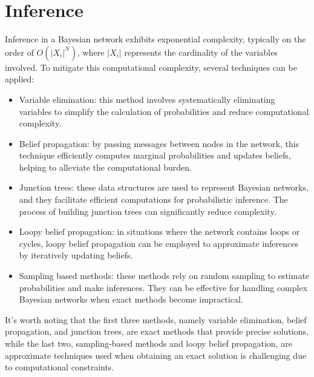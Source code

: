 \section{Inference}

Inference in a Bayesian network exhibits exponential complexity, typically on the order of $O(\left\lvert X_i \right\rvert^N)$, where $\left\lvert X_i \right\rvert$ represents the cardinality of the variables involved. 
To mitigate this computational complexity, several techniques can be applied:

\begin{itemize}
    \item Variable elimination: this method involves systematically eliminating variables to simplify the calculation of probabilities and reduce computational complexity.
    \item Belief propagation: by passing messages between nodes in the network, this technique efficiently computes marginal probabilities and updates beliefs, helping to alleviate the computational burden.
    \item Junction trees: these data structures are used to represent Bayesian networks, and they facilitate efficient computations for probabilistic inference. 
        The process of building junction trees can significantly reduce complexity.
    \item Loopy belief propagation: in situations where the network contains loops or cycles, loopy belief propagation can be employed to approximate inferences by iteratively updating beliefs.
    \item Sampling based methods: these methods rely on random sampling to estimate probabilities and make inferences. 
        They can be effective for handling complex Bayesian networks when exact methods become impractical.
\end{itemize}
It's worth noting that the first three methods, namely variable elimination, belief propagation, and junction trees, are exact methods that provide precise solutions, while the last two, sampling-based methods and loopy belief propagation, are approximate techniques used when obtaining an exact solution is challenging due to computational constraints.